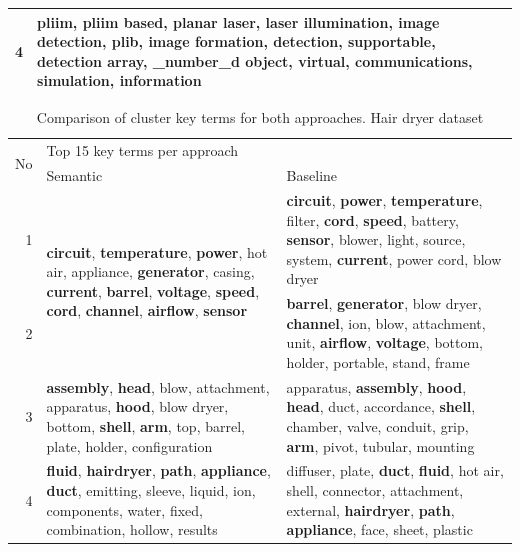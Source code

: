 \begin{table}[htbp]
\begin{tabular}{|r|p{12.39em}|l|l|}
\cmidrule{1-2}    4 & \textbf{pliim}, \textbf{pliim} \textbf{based}, \textbf{planar} \textbf{laser}, \textbf{laser} \textbf{illumination}, \textbf{image} \textbf{detection}, \textbf{plib}, \textbf{image} \textbf{formation}, \textbf{detection}, \textbf{supportable}, \textbf{detection} \textbf{array}, \_number\_d object, virtual, communications, simulation, information &   &  \\
    \bottomrule
    \end{tabular}%
  \label{tab:addlabel}%
\end{table}%

\begin{table}[htbp]
  \centering
  \caption{Comparison of cluster key terms for both approaches. Hair dryer dataset}
    \begin{tabular}{|r|p{16em}|p{18em}|}
    \toprule
    \multicolumn{1}{|c|}{\multirow{2}[4]{*}{No}} & \multicolumn{2}{p{27.61em}|}{Top 15 key terms per approach} \\
\cmidrule{2-3}      & Semantic & Baseline \\
    \midrule
    1 & \multirow{2}[4]{=}{\textbf{circuit}, \textbf{temperature}, \textbf{power}, hot air, appliance, \textbf{generator}, casing, \textbf{current}, \textbf{barrel}, \textbf{voltage}, \textbf{speed}, \textbf{cord}, \textbf{channel}, \textbf{airflow}, \textbf{sensor}} & \textbf{circuit}, \textbf{power}, \textbf{temperature}, filter, \textbf{cord}, \textbf{speed}, battery, \textbf{sensor}, blower, light, source, system, \textbf{current}, power cord, blow dryer \\
\cmidrule{1-1}\cmidrule{3-3}    2 & \multicolumn{1}{l|}{} & \textbf{barrel}, \textbf{generator}, blow dryer, \textbf{channel}, ion, blow, attachment, unit, \textbf{airflow}, \textbf{voltage}, bottom, holder, portable, stand, frame \\
    \midrule
    3 & \textbf{assembly}, \textbf{head}, blow, attachment, apparatus, \textbf{hood}, blow dryer, bottom, \textbf{shell}, \textbf{arm}, top, barrel, plate, holder, configuration & apparatus, \textbf{assembly}, \textbf{hood}, \textbf{head}, duct, accordance, \textbf{shell}, chamber, valve, conduit, grip, \textbf{arm}, pivot, tubular, mounting \\
    \midrule
    4 & \textbf{fluid}, \textbf{hairdryer}, \textbf{path}, \textbf{appliance}, \textbf{duct}, emitting, sleeve, liquid, ion, components, water, fixed, combination, hollow, results & diffuser, plate, \textbf{duct}, \textbf{fluid}, hot air, shell, connector, attachment, external, \textbf{hairdryer}, \textbf{path}, \textbf{appliance}, face, sheet, plastic \\

\end{tabular}
\end{table}
